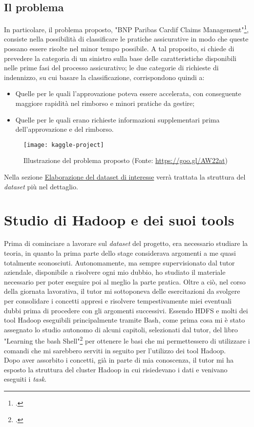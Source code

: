 \subsection{Il problema}
In particolare, il problema proposto, "BNP Paribas Cardif Claims Management"\footcite{https://www.kaggle.com/c/bnp-paribas-cardif-claims-management}, consiste nella possibilità di classificare le pratiche assicurative in modo che queste possano essere risolte nel minor tempo possibile. A tal proposito, si chiede di prevedere la categoria di un sinistro sulla base delle caratteristiche disponibili nelle prime fasi del processo assicurativo; le due categorie di richieste di indennizzo, su cui basare la classificazione, corrispondono quindi a:
\begin{itemize}
	\item Quelle per le quali l'approvazione poteva essere accelerata, con conseguente maggiore rapidità nel rimborso e minori pratiche da gestire;
	\item Quelle per le quali erano richieste informazioni supplementari prima dell'approvazione e del rimborso.
\end{itemize}
\clearpage
\begin{figure}[!h] 
	\centering 
	\texttt{[image: kaggle-project]}
	\caption{Illustrazione del problema proposto (Fonte: \href{https://goo.gl/AW22at}{https://goo.gl/AW22at})}
\end{figure}
Nella sezione \hyperref[dataset]{Elaborazione del dataset di interesse} verrà trattata la struttura del \textit{dataset} più nel dettaglio.


\section{Studio di Hadoop e dei suoi tools}
Prima di cominciare a lavorare sul \textit{dataset} del progetto, era necessario studiare la teoria, in quanto la prima parte dello stage considerava argomenti a me quasi totalmente sconosciuti.
Autonomamente, ma sempre supervisionato dal tutor aziendale, disponibile a risolvere ogni mio dubbio, ho studiato il materiale necessario per poter eseguire poi al meglio la parte pratica. Oltre a ciò, nel corso della giornata lavorativa, il tutor mi sottoponeva delle esercitazioni da svolgere per consolidare i concetti appresi e risolvere tempestivamente miei eventuali dubbi prima di procedere con gli argomenti successivi.
Essendo \gls{HDFS} e molti dei tool Hadoop eseguibili principalmente tramite \gls{Bash}, come prima cosa mi è stato assegnato lo studio autonomo di alcuni capitoli, selezionati dal tutor, del libro "Learning the bash Shell"\footcite{http://shop.oreilly.com/product/9780596009656.do} per ottenere le basi che mi permettessero di utilizzare i comandi che mi sarebbero serviti in seguito per l'utilizzo dei tool Hadoop.\\
Dopo aver assorbito i concetti, già in parte di mia conoscenza, il tutor mi ha esposto la struttura del \gls{cluster} Hadoop in cui risiedevano i dati e venivano eseguiti i \textit{task}. 
